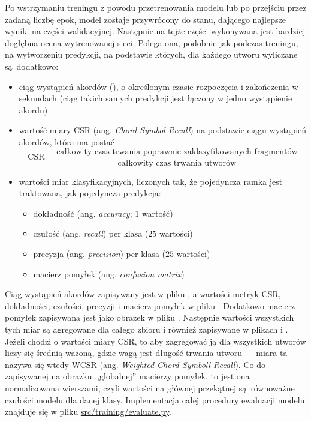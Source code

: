 Po wstrzymaniu treningu z powodu przetrenowania modelu lub po przejściu przez zadaną liczbę epok,
model zostaje przywrócony do stanu, dającego najlepsze wyniki na części walidacyjnej. Następnie na
tejże części wykonywana jest bardziej dogłębna ocena wytrenowanej sieci. Polega ona, podobnie jak
podczas treningu, na wytworzeniu predykcji, na podstawie których, dla każdego utworu wyliczane
są dodatkowo: 
\begin{itemize}
    \item ciąg wystąpień akordów (), o określonym czasie rozpoczęcia i
        zakończenia w sekundach (ciąg takich samych predykcji jest łączony w jedno wystąpienie
        akordu)
    \item wartość miary CSR (ang. \emph{Chord Symbol Recall}) na podstawie
        ciągu wystąpień akordów, która ma postać
        \begin{displaymath}
            \textrm{CSR} = \frac
                        {\textrm{całkowity czas trwania poprawnie zaklasyfikowanych fragmentów}}
                        {\textrm{całkowity czas trwania utworów}}
        \end{displaymath}
    \item wartości miar klasyfikacyjnych, liczonych tak, że pojedyncza ramka jest traktowana, jak
        pojedyncza predykcja:
        \begin{itemize}
            \item dokładność (ang. \emph{accuracy}; $1$ wartość)
            \item czułość (ang. \emph{recall}) per klasa ($25$ wartości)
            \item precyzja (ang. \emph{precision}) per klasa ($25$ wartości)
            \item macierz pomyłek (ang. \emph{confusion matrix})
        \end{itemize}
\end{itemize}
Ciąg wystąpień akordów zapisywany jest w pliku , a wartości metryk CSR, dokładności, czułości, precyzji i macierz pomyłek w pliku . Dodatkowo macierz pomyłek zapisywana jest jako obrazek w pliku . Następnie wartości wszystkich tych miar są agregowane dla całego zbioru i również zapisywane w plikach  i . Jeżeli chodzi o wartości miary CSR, to aby zagregować ją dla wszystkich utworów liczy się średnią ważoną, gdzie wagą jest długość trwania utworu --- miara ta nazywa się wtedy WCSR (ang. \emph{Weighted Chord Symboll Recall}). Co do zapisywanej na obrazku ,,globalnej'' macierzy pomyłek, to jest ona normalizowana wierszami, czyli wartości na głównej przekątnej są równoważne czułości modelu dla danej klasy. Implementacja całej procedury ewaluacji modelu znajduje się w pliku \url{src/training/evaluate.py}.

